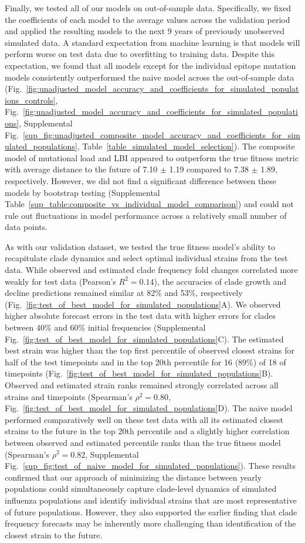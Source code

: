 Finally, we tested all of our models on out-of-sample data.
Specifically, we fixed the coefficients of each model to the average values across the validation period and applied the resulting models to the next 9 years of previously unobserved simulated data.
A standard expectation from machine learning is that models will perform worse on test data due to overfitting to training data.
Despite this expectation, we found that all models except for the individual epitope mutation models consistently outperformed the naive model across the out-of-sample data (Fig.~\ref{fig:unadjusted_model_accuracy_and_coefficients_for_simulated_populations_controls}, Fig.~\ref{fig:unadjusted_model_accuracy_and_coefficients_for_simulated_populations}, Supplemental Fig.~\ref{sup_fig:unadjusted_composite_model_accuracy_and_coefficients_for_simulated_populations}, Table~\ref{table_simulated_model_selection}).
The composite model of mutational load and LBI appeared to outperform the true fitness metric with average distance to the future of 7.10 $\pm$ 1.19 compared to 7.38 $\pm$ 1.89, respectively.
However, we did not find a significant difference between these models by bootstrap testing (Supplemental Table~\ref{sup_table:composite_vs_individual_model_comparison}) and could not rule out fluctuations in model performance across a relatively small number of data points.

As with our validation dataset, we tested the true fitness model's ability to recapitulate clade dynamics and select optimal individual strains from the test data.
While observed and estimated clade frequency fold changes correlated more weakly for test data (Pearson's $R^2 = 0.14$), the accuracies of clade growth and decline predictions remained similar at 82\% and 53\%, respectively (Fig.~\ref{fig:test_of_best_model_for_simulated_populations}A).
We observed higher absolute forecast errors in the test data with higher errors for clades between 40\% and 60\% initial frequencies (Supplemental Fig.~\ref{fig:test_of_best_model_for_simulated_populations}C).
The estimated best strain was higher than the top first percentile of observed closest strains for half of the test timepoints and in the top 20th percentile for 16 (89\%) of 18 of timepoints (Fig.~\ref{fig:test_of_best_model_for_simulated_populations}B).
Observed and estimated strain ranks remained strongly correlated across all strains and timepoints (Spearman's $\rho^2 = 0.80$, Fig.~\ref{fig:test_of_best_model_for_simulated_populations}D).
The naive model performed comparatively well on these test data with all its estimated closest strains to the future in the top 20th percentile and a slightly higher correlation between observed and estimated percentile ranks than the true fitness model (Spearman's $\rho^2 = 0.82$, Supplemental Fig.~\ref{sup_fig:test_of_naive_model_for_simulated_populations}).
These results confirmed that our approach of minimizing the distance between yearly populations could simultaneously capture clade-level dynamics of simulated influenza populations and identify individual strains that are most representative of future populations.
However, they also supported the earlier finding that clade frequency forecasts may be inherently more challenging than identification of the closest strain to the future.

